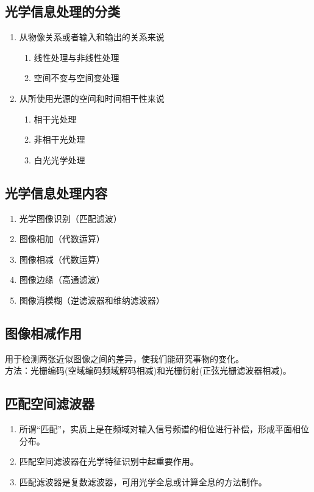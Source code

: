 \documentclass[twocolumn]{ctexart}
\begin{document}
\subsection{光学信息处理的分类}
\begin{enumerate}
    \item 从物像关系或者输入和输出的关系来说
    \begin{enumerate}
        \item 线性处理与非线性处理
        \item 空间不变与空间变处理
    \end{enumerate}
    \item 从所使用光源的空间和时间相干性来说
    \begin{enumerate}
        \item 相干光处理
        \item 非相干光处理
        \item 白光光学处理
    \end{enumerate}
\end{enumerate}
\subsection{光学信息处理内容}
\begin{enumerate}
    \item 光学图像识别（匹配滤波）
    \item 图像相加（代数运算）
    \item 图像相减（代数运算）
    \item 图像边缘（高通滤波）
    \item 图像消模糊（逆滤波器和维纳滤波器）
\end{enumerate}
\subsection{图像相减作用}
用于检测两张近似图像之间的差异，使我们能研究事物的变化。\\
方法：光栅编码(空域编码频域解码相减)和光栅衍射(正弦光栅滤波器相减)。
\subsection{匹配空间滤波器}
\begin{enumerate}
    \item 所谓“匹配”，实质上是在频域对输入信号频谱的相位进行补偿，形成平面相位分布。
    \item 匹配空间滤波器在光学特征识别中起重要作用。
    \item 匹配滤波器是复数滤波器，可用光学全息或计算全息的方法制作。
\end{enumerate}
\end{document}
